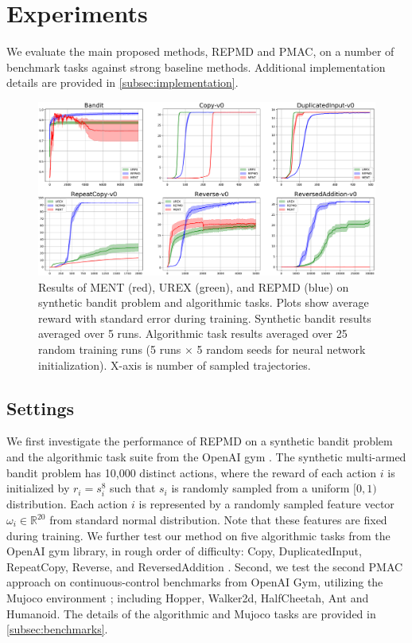 
\section{Experiments}
\label{sec:experiments}

We evaluate the main proposed methods, REPMD and PMAC,
on a number of benchmark tasks against strong baseline methods.
Additional implementation details are provided in \cref{subsec:implementation}. 

\begin{figure}[t]
\begin{center}
\includegraphics[width=0.75\linewidth]{./bandit_algorithmic_results.pdf}
\end{center}
\caption{
Results of MENT (red), UREX (green), and REPMD (blue) on synthetic bandit
problem and algorithmic tasks.
Plots show average reward with standard error during training.
Synthetic bandit results averaged over 5 runs.
Algorithmic task results averaged over 25 random training runs
(5 runs $\times$ 5 random seeds for neural network initialization).
X-axis is number of sampled trajectories.
} 
\label{fig:results}
\end{figure}

\subsection{Settings}
\label{subsec:tasks}

We first investigate the performance of REPMD on a synthetic bandit problem
and the algorithmic task suite from the OpenAI gym \citep{brockman2016openai}.
The synthetic multi-armed bandit problem has 10,000 distinct actions,
where
the reward of each action $i$ is initialized by $r_i = s_i^{8}$
such that $s_i$ is randomly sampled from a uniform $[0,1)$ distribution.
Each action $i$ is represented by a randomly sampled feature vector
$\omega_i\in \mathbb{R}^{20}$ from standard normal distribution.
Note that these features are fixed during training.
We further test our method on five algorithmic tasks from the OpenAI gym
library, in rough order of difficulty:
Copy, DuplicatedInput, RepeatCopy, Reverse, and ReversedAddition
\citep{brockman2016openai}.
%
Second, we test the second PMAC approach on continuous-control benchmarks
from OpenAI Gym, utilizing the Mujoco environment
\citep{brockman2016openai,todorov2012mujoco};
including Hopper, Walker2d, HalfCheetah, Ant and Humanoid.
The details of the algorithmic and Mujoco tasks are provided in
\cref{subsec:benchmarks}. 

